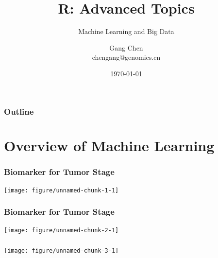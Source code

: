 \documentclass[UTF8]{beamer}\usepackage[]{graphicx}\usepackage[]{color}
\title{R: Advanced Topics}
\subtitle{Machine Learning and Big Data}
\author{Gang Chen\\ chengang@genomics.cn}
\date{\today}
\newenvironment{knitrout}{}{} %
\begin{document}
\begin{frame}
\titlepage
\end{frame}

\begin{frame}[t]\frametitle{Outline}
\tableofcontents[hideallsubsections]
\end{frame}

\section{Overview of Machine Learning}

\begin{frame}[fragile]
  \frametitle{Biomarker for Tumor Stage}
\begin{knitrout}
\color{fgcolor}

{\centering \texttt{[image: figure/unnamed-chunk-1-1]} 

}



\end{knitrout}
\end{frame}

\begin{frame}[fragile]
  \frametitle{Biomarker for Tumor Stage}

\begin{knitrout}
\color{fgcolor}

{\centering \texttt{[image: figure/unnamed-chunk-2-1]} 

}



\end{knitrout}
\end{frame}
\begin{frame}[fragile]
  \frametitle{}

\begin{knitrout}
\color{fgcolor}

{\centering \texttt{[image: figure/unnamed-chunk-3-1]} 

}



\end{knitrout}
\end{frame}
\end{document}
